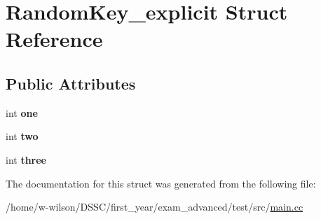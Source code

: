 \hypertarget{struct_random_key__explicit}{}\section{Random\+Key\+\_\+explicit Struct Reference}
\label{struct_random_key__explicit}
\subsection*{Public Attributes}
\begin{DoxyCompactItemize}
\item 
\mbox{\label{struct_random_key__explicit_a79914f3641484a20ac0131e37d0d6f2d}} 
int {\bfseries one}
\item 
\mbox{\label{struct_random_key__explicit_a822943d74fc3b07a3c08c340e26c0a8c}} 
int {\bfseries two}
\item 
\mbox{\label{struct_random_key__explicit_accf813ffe7cbeced0543c1eea0f13f51}} 
int {\bfseries three}
\end{DoxyCompactItemize}


The documentation for this struct was generated from the following file\+:\begin{DoxyCompactItemize}
\item 
/home/w-\/wilson/\+D\+S\+S\+C/first\+\_\+year/exam\+\_\+advanced/test/src/\hyperlink{main_8cc}{main.\+cc}\end{DoxyCompactItemize}
